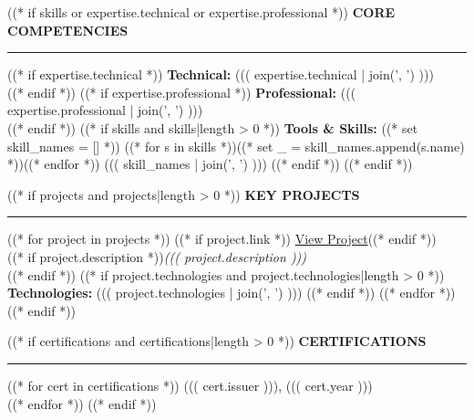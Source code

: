 \documentclass[11pt,a4paper]{article}
\newcommand{\sectionline}{\noindent\textcolor{divider}{\rule{\linewidth}{0.4pt}}\vspace{4pt}}
\begin{document}
\begin{minipage}[t]{0.85\textwidth}
((* if skills or expertise.technical or expertise.professional *))
{\fontsize{10}{12}\selectfont\bfseries\MakeUppercase{Core Competencies}}\\[2pt]
\sectionline
((* if expertise.technical *))
{\small\bfseries Technical:} {\small ((( expertise.technical | join(', ') )))}\\[2pt]
((* endif *))
((* if expertise.professional *))
{\small\bfseries Professional:} {\small ((( expertise.professional | join(', ') )))}\\[2pt]
((* endif *))
((* if skills and skills|length > 0 *))
{\small\bfseries Tools \& Skills:}
((* set skill_names = [] *))
((* for s in skills *))((* set _ = skill_names.append(s.name) *))((* endfor *))
{\small ((( skill_names | join(', ') )))}
((* endif *))
\vspace{8pt}
((* endif *))

((* if projects and projects|length > 0 *))
{\fontsize{10}{12}\selectfont\bfseries\MakeUppercase{Key Projects}}\\[2pt]
\sectionline
((* for project in projects *))
((* if project.link *)) \hfill {\scriptsize\href{((* if 'http' not in project.link *))https://((* endif *))((( project.link )))}{View Project}}((* endif *))\\
((* if project.description *)){\small\textit{((( project.description )))}}\\((* endif *))
((* if project.technologies and project.technologies|length > 0 *))
{\small\textbf{Technologies:} ((( project.technologies | join(', ') )))}
((* endif *))
\vspace{6pt}
((* endfor *))
((* endif *))

((* if certifications and certifications|length > 0 *))
{\fontsize{10}{12}\selectfont\bfseries\MakeUppercase{Certifications}}\\[2pt]
\sectionline
((* for cert in certifications *))
 \hfill {\small\color{muted} ((( cert.issuer ))), ((( cert.year )))}\\[6pt]
((* endfor *))
((* endif *))

\end{minipage}
\end{document}
